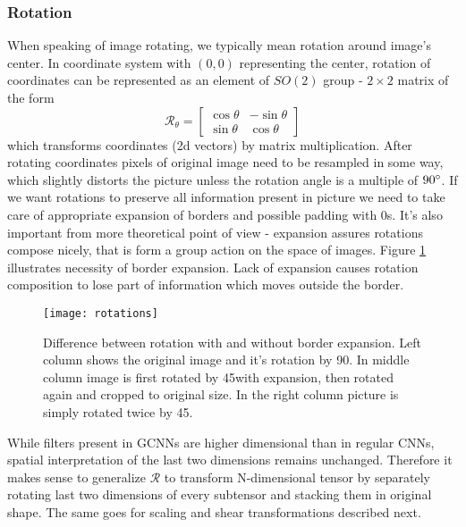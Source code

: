    \subsubsection{Rotation}
        When speaking of image rotating, we typically mean rotation around
        image's center. In coordinate system with $(0,0)$ representing the
        center, rotation of coordinates
        can be represented as an element of $SO(2)$ group - $2\times2$ matrix of
        the form
        $$\mathcal{R}_\theta = \begin{bmatrix}
                \cos\theta & -\sin\theta \\
                \sin\theta &  \cos\theta
            \end{bmatrix}$$
        which transforms coordinates (2d vectors) by matrix multiplication.
        After rotating coordinates pixels of original image need to be resampled
        in some way, which slightly distorts the picture unless the rotation angle
        is a multiple of $90\degree$. If we want rotations to preserve all
        information present in picture
        we need to take care of appropriate
        expansion of borders and possible padding with 0s.
        It's also important from more theoretical point of view - expansion
        assures rotations compose nicely, that is form a group
        action on the space of images.
        Figure
        \ref{fig:rotation_pics} illustrates necessity of border expansion.
        Lack of expansion causes rotation composition to lose part of
        information which moves outside the border.

        \begin{figure}[h]
            \centering
            \texttt{[image: rotations]}
            \caption{Difference between rotation with and without border
                expansion. Left column shows the original image and it's
                rotation by 90\degree. In middle column image is first rotated
                by 45\degree with expansion, then rotated again and cropped to
                original size. In the right column picture is simply rotated
                twice by 45\degree.}
            \label{fig:rotation_pics}
        \end{figure}
        While filters present in GCNNs are higher dimensional than in regular
        CNNs, spatial interpretation of the last two dimensions remains
        unchanged. Therefore it makes sense to generalize $\mathcal{R}$ to
        transform N-dimensional tensor by separately rotating last two
        dimensions of every subtensor and stacking them in original shape.
        The same goes for scaling and shear transformations described next.

